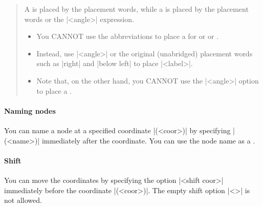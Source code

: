 \begin{quote}
\warning
A  is placed by the placement words, while a  is placed by the placement words or the |<angle>| expression.
\begin{itemize}
\item You CANNOT use the abbreviations to place a  for  or  or .
\item 
Instead, use |<angle>| or the original (unabridged) placement words such as |right| and |below left| to place |<label>|.
\item
Note that, on the other hand, you CANNOT use the |<angle>| option to place a .
\end{itemize}
\end{quote}


\begin{tzcode}{.3}
\end{tzcode}

\paragraph{Naming nodes}
You can name a node at a specified coordinate |(<coor>)| by specifying |(<name>)| immediately after the coordinate. You can use the node name as a .

\begin{tzcode}{.3}
\end{tzcode}

\paragraph{Shift}
You can move the coordinates by specifying the option |<shift coor>| immediately before the coordinate |(<coor>)|.
The empty shift option |<>| is not allowed.

